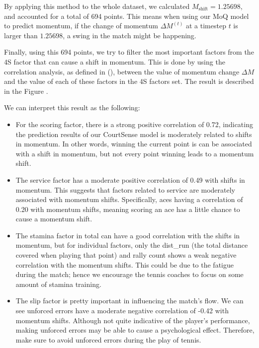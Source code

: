 \documentclass[12pt]{article}  %
\begin{document}
By applying this method to the whole dataset, we calculated $M_{\text{shift}} = 1.25698$, and accounted for a total of 694 points. This means when using our MoQ model to predict momentum, if the change of momentum $\Delta M^{(t)}$ at a timestep $t$ is larger than $1.25698$, a swing in the match might be happening.

Finally, using this 694 points, we try to filter the most important factors from the 4S factor that can cause a shift in momentum. This is done by using the correlation analysis, as defined in (), between the value of momentum change $\Delta M$ and the value of each of these factors in the 4S factors set. The result is described in the Figure .

We can interpret this result as the following: 
\begin{itemize}
	    \setlength{\parsep}{0ex} %
	\setlength{\topsep}{0ex} %
	\setlength{\itemsep}{0ex} %
	\item For the scoring factor, there is a strong positive correlation of 0.72, indicating the prediction results of our CourtSense model is moderately related to shifts in momentum. In other words, winning the current point is can be associated with a shift in momentum, but not every point winning leads to a momentum shift.
	\item The service factor has a moderate positive correlation of 0.49 with shifts in momentum. This suggests that factors related to service are moderately associated with momentum shifts. Specifically, aces having a correlation of 0.20 with momentum shifts, meaning scoring an ace has a little chance to cause a momentum shift.
	\item The stamina factor in total can have a good correlation with the shifts in momentum, but for individual factors, only the dist\_run (the total distance covered when playing that point) and rally count shows a weak negative correlation with the momentum shifts. This could be due to the fatigue during the match; hence we encourage the tennis coaches to focus on some amount of stamina training.
	\item The slip factor is pretty important in influencing the match's flow. We can see unforced errors have a moderate negative correlation of -0.42 with momentum shifts. Although not quite indicative of the player's performance, making unforced errors may be able to cause a psychological effect. Therefore, make sure to avoid unforced errors during the play of tennis.
\end{itemize}
\end{document}
